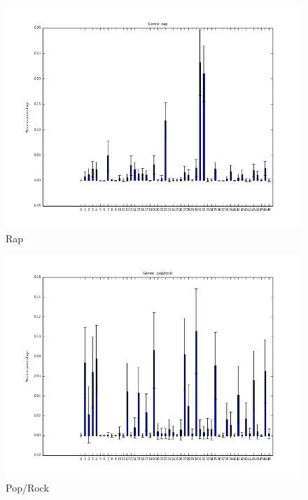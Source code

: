 \documentclass[t,ignorenonframetext]{beamer}
\begin{document}
\begin{frame}
   \begin{minipage}[b][.35\textheight][t]{.47\textwidth}
    \begin{figure}
\includegraphics[scale=0.2]{bar_charts/rap}
\caption{Rap}
\end{figure}
\end{minipage}\hfill
    \begin{minipage}[b][.35\textheight][t]{.47\textwidth}
    \begin{figure}
\includegraphics[scale=0.2]{bar_charts/pop-rock}
\caption{Pop/Rock}
\end{figure}
\end{minipage}%
\end{frame}
\end{document}

